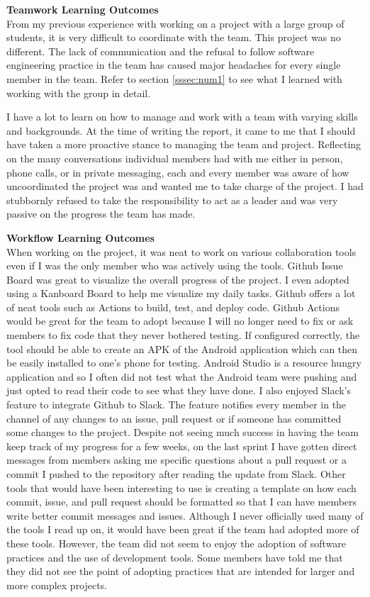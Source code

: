 \documentclass[letterpaper,twocolumn,10pt]{article}
\begin{document}
{{\textbf{Teamwork Learning Outcomes}\\ 
From my previous experience with working on a project with a large group of students, it is very difficult to coordinate with the team. This project was no different. The lack of communication and the refusal to follow software engineering practice in the team has caused major headaches for every single member in the team. Refer to section \ref{sssec:num1} to see what I learned with working with the group in detail.

I have a lot to learn on how to manage and work with a team with varying skills and backgrounds. At the time of writing the report, it came to me that I should have taken a more proactive stance to managing the team and project. Reflecting on the many conversations individual members had with me either in person, phone calls, or in private messaging, each and every member was aware of how uncoordinated the project was and wanted me to take charge of the project. I had stubbornly refused to take the responsibility to act as a leader and was very passive on the progress the team has made.

\textbf{Workflow Learning Outcomes}\\
When working on the project, it was neat to work on various collaboration tools even if I was the only member who was actively using the tools. Github Issue Board was great to visualize the overall progress of the project. I even adopted using a Kanboard Board to help me visualize my daily tasks. Github offers a lot of neat tools such as Actions to build, test, and deploy code. Github Actions would be great for the team to adopt because I will no longer need to fix or ask members to fix code that they never bothered testing. If configured correctly, the tool should be able to create an APK of the Android application which can then be easily installed to one's phone for testing. Android Studio is a resource hungry application and so I often did not test what the Android team were pushing and just opted to read their code to see what they have done. I also enjoyed Slack's feature to integrate Github to Slack. The feature notifies every member in the channel of any changes to an issue, pull request or if someone has committed some changes to the project. Despite not seeing much success in having the team keep track of my progress for a few weeks, on the last sprint I have gotten direct messages from members asking me specific questions about a pull request or a commit I pushed to the repository after reading the update from Slack. Other tools that would have been interesting to use is creating a template on how each commit, issue, and pull request should be formatted so that I can have members write better commit messages and issues. Although I never officially used many of the tools I read up on, it would have been great if the team had adopted more of these tools. However, the team did not seem to enjoy the adoption of software practices and the use of development tools. Some members have told me that they did not see the point of adopting practices that are intended for larger and more complex projects.\\

}}
\end{document}

